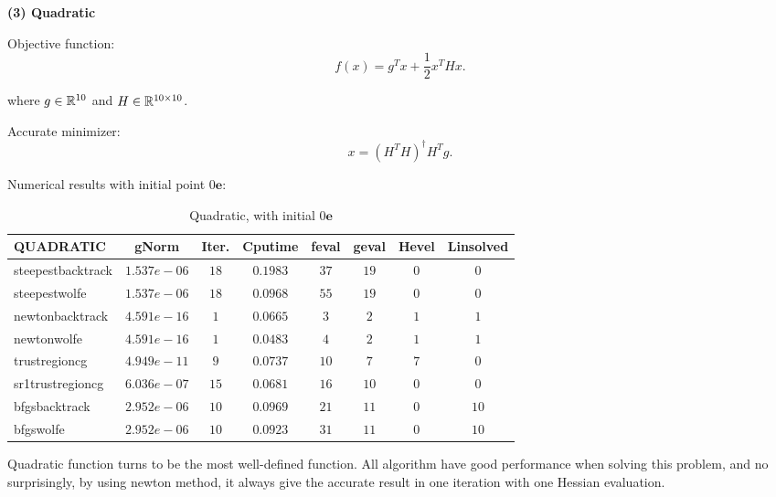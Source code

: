 \documentclass[11pt]{report}
\begin{document}
\textbf{(3) Quadratic }

Objective function: 
\begin{equation}
    f(x) = g^Tx+\frac{1}{2}x^THx.
\end{equation}

where $g\in\mathbb{R}^{10}$ and $H\in \mathbb{R}^{10\times10}$.

Accurate minimizer:
\begin{equation}
    x = (H^TH)^{\dagger}H^Tg.
\end{equation}

Numerical results with initial point $0\mathbf{e}$:
\begin{table}[H]
    \caption{Quadratic, with initial $0\mathbf{e}$}
    \label{tab:Quadratic_initial}
    \begin{center}
        \begin{tabular}{l|ccccccc}
\textbf{QUADRATIC}& gNorm       &   Iter.  &   Cputime   &   feval&geval&Hevel&Linsolved\\
\hline
steepestbacktrack   &   $1.537e-06 $&   $18   $&   $0.1983  $&$37   $&$19   $&$0    $&$0    $       \\
steepestwolfe       &   $1.537e-06 $&   $18   $&   $0.0968  $&$55   $&$19   $&$0    $&$0    $       \\
newtonbacktrack     &   $4.591e-16 $&   $1    $&   $0.0665  $&$3    $&$2    $&$1    $&$1    $       \\
newtonwolfe         &   $4.591e-16 $&   $1    $&   $0.0483  $&$4    $&$2    $&$1    $&$1    $       \\
trustregioncg       &   $4.949e-11 $&   $9    $&   $0.0737  $&$10   $&$7    $&$7    $&$0    $       \\
sr1trustregioncg    &   $6.036e-07 $&   $15   $&   $0.0681  $&$16   $&$10   $&$0    $&$0    $       \\
bfgsbacktrack       &   $2.952e-06 $&   $10   $&   $0.0969  $&$21   $&$11   $&$0    $&$10   $       \\
bfgswolfe           &   $2.952e-06 $&   $10   $&   $0.0923  $&$31   $&$11   $&$0    $&$10   $       \\
 \end{tabular}
    \end{center}
\end{table}

Quadratic function turns to be the most well-defined function. All algorithm have good performance when solving this problem, and no surprisingly, by using newton method, it always give the accurate result in one iteration with one Hessian evaluation. 
\end{document}
